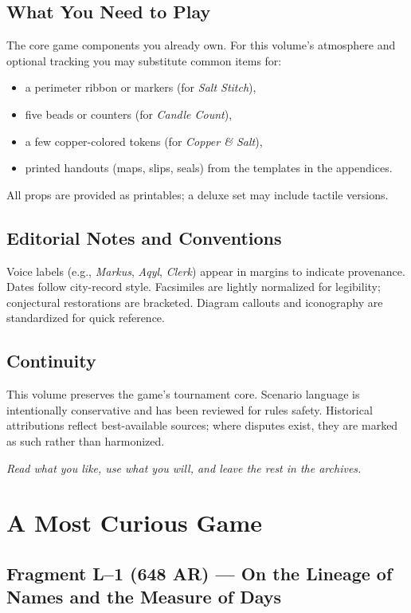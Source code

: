 \documentclass[11pt]{article}
\begin{document}
\subsection{What You Need to Play}
The core game components you already own. For this volume’s atmosphere and optional tracking you may substitute common items for:
\begin{itemize}
  \item a perimeter ribbon or markers (for \emph{Salt Stitch}),
  \item five beads or counters (for \emph{Candle Count}),
  \item a few copper-colored tokens (for \emph{Copper \& Salt}),
  \item printed handouts (maps, slips, seals) from the templates in the appendices.
\end{itemize}
All props are provided as printables; a deluxe set may include tactile versions.

\subsection{Editorial Notes and Conventions}
Voice labels (e.g., \emph{Markus}, \emph{Aqyl}, \emph{Clerk}) appear in margins to indicate provenance. Dates follow city-record style. Facsimiles are lightly normalized for legibility; conjectural restorations are bracketed. Diagram callouts and iconography are standardized for quick reference.

\subsection{Continuity}
This volume preserves the game’s tournament core. Scenario language is intentionally conservative and has been reviewed for rules safety. Historical attributions reflect best-available sources; where disputes exist, they are marked as such rather than harmonized.

\medskip
\noindent\textit{Read what you like, use what you will, and leave the rest in the archives.}


\section{A Most Curious Game}
\label{sec:curious-game}
{}

\subsection{Fragment L--1 (648 AR) --- On the Lineage of Names and the Measure of Days}
\label{frag:l1}
{}
\end{document}
